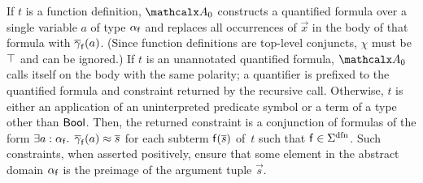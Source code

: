 If $t$ is a function definition, %
$\conv_0$ constructs a quantified formula over a single variable
$a$ of type $\alpha_{\mathsf{f}}$ and replaces all occurrences of $\vec x$ in
the body of that formula with $\overline{\gamma}_{\mathsf{f}}( a )$. 
(Since function definitions are top-level conjuncts, %
$\chi$ must be $\top$ and can be ignored.)
%
If $t$ is an unannotated quantified formula, $\conv_0$ calls itself
on the body with the same polarity; a quantifier is prefixed to the
quantified formula and constraint returned by the recursive call.
Otherwise, $t$ is either an application of an uninterpreted predicate symbol or a term
of a type other than $\mathsf{Bool}$. Then, the returned constraint is a conjunction of
formulas of the form $\exists a : {\alpha_{\mathsf{f}}}.\;\, \overline{\gamma}_{\mathsf{f}}(
a ) \approx \overline{s}$ for each subterm $\mathsf{f}( \overline{s} )$ of~$t$ such that $\con{f}
\in \sfundefs{\Sigma}$. Such constraints, when asserted positively, ensure that
some element in the abstract domain $\alpha_{\mathsf{f}}$ is the preimage of
the argument tuple $\vec s$. %



